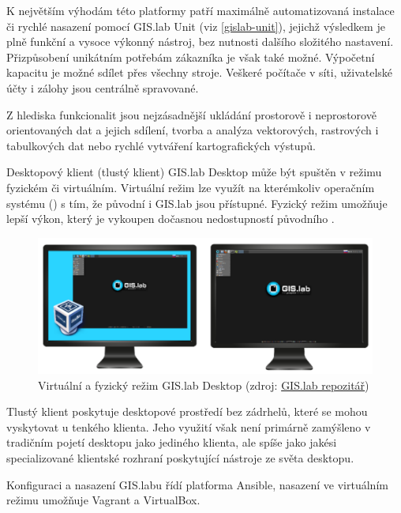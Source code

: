 K největším výhodám této platformy patří maximálně automatizovaná
instalace či rychlé nasazení pomocí GIS.lab Unit (viz
\ref{gislab-unit}), jejichž výsledkem je plně funkční a vysoce výkonný
nástroj, bez nutnosti dalšího složitého nastavení. Přizpůsobení
unikátním potřebám zákazníka je však také možné. Výpočetní kapacitu je
možné sdílet přes všechny stroje. Veškeré počítače v síti, uživatelské
účty i zálohy jsou centrálně spravované.

Z hlediska funkcionalit jsou nejzásadnější ukládání prostorově i
neprostorově orientovaných dat a jejich sdílení, tvorba a analýza
vektorových, rastrových i tabulkových dat nebo rychlé vytváření
kartografických výstupů.

Desktopový klient (tlustý klient) GIS.lab Desktop může být spuštěn v
režimu fyzickém či virtuálním. Virtuální režim lze využít na
kterémkoliv operačním systému () s tím, že původní  i
GIS.lab jsou přístupné. Fyzický režim umožňuje lepší výkon, který je
vykoupen dočasnou nedostupností původního .

\begin{figure}[H] \centering
    \includegraphics[width=450pt]{./pictures/physical-or-virtual-mode.png}
    \caption[Virtuální a fyzický režim GIS.lab Desktop]{Virtuální a fyzický režim GIS.lab Desktop (zdroj:
	\href{https://github.com/gislab-npo/gislab-doc/blob/master/img/installation/physical-or-virtual-mode.png}{GIS.lab repozitář})}
	\label{fig:gislab-rezim}
\end{figure}

Tlustý klient poskytuje desktopové prostředí bez zádrhelů, které se
mohou vyskytovat u tenkého klienta. Jeho využití však není primárně
zamýšleno v tradičním pojetí desktopu jako jediného klienta, ale spíše
jako jakési specializované klientské rozhraní poskytující nástroje ze
světa desktopu.

Konfiguraci a nasazení GIS.labu řídí platforma Ansible, nasazení ve
virtuálním režimu umožňuje Vagrant a VirtualBox.

